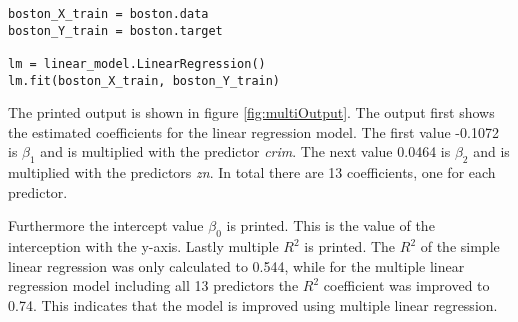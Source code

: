 \begin{lstlisting}[caption={Linear regression of multiple predictors}, label=lst:mul_lin_reg, mathescape=true]
boston_X_train = boston.data
boston_Y_train = boston.target

lm = linear_model.LinearRegression()
lm.fit(boston_X_train, boston_Y_train)
\end{lstlisting}



The printed output is shown in figure \ref{fig:multiOutput}. The output first shows the estimated coefficients for the linear regression model. The first value -0.1072 is $\beta_1$ and is multiplied with the predictor \emph{crim}. The next value 0.0464 is $\beta_2$ and is multiplied with the predictors \emph{zn}. In total there are 13 coefficients, one for each predictor.

Furthermore the intercept value $\beta_0$ is printed. This is the value of the interception with the y-axis. Lastly multiple $R^2$ is printed. The $R^2$ of the simple linear regression was only calculated to 0.544, while for the multiple linear regression model including all 13 predictors the $R^2$ coefficient was improved to 0.74. This indicates that the model is improved using multiple linear regression.



